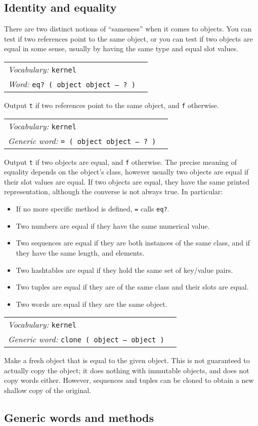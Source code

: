 \documentclass{book}
\newcommand{\vocabulary}[1]{\emph{Vocabulary:} \texttt{#1}&\\}
\newcommand{\ordinaryword}[2]{\index{\texttt{#1}}\emph{Word:} \texttt{#2}&\\}
\newcommand{\genericword}[2]{\index{\texttt{#1}}\emph{Generic word:} \texttt{#2}&\\}
\newcommand{\wordtable}[1]{


\begin{tabularx}{12cm}{lX}
\hline
#1
\hline
\end{tabularx}

}
\begin{document}
\subsection{\label{equality}Identity and equality}

There are two distinct notions of ``sameness'' when it comes to objects. You can test if two references point to the same object, or you can test if two objects are equal in some sense, usually by having the same type and equal slot values.
\wordtable{
\vocabulary{kernel}
\ordinaryword{eq?}{eq?~( object object -- ?~)}
}
Output \texttt{t} if two references point to the same object, and \texttt{f} otherwise.
\wordtable{
\vocabulary{kernel}
\genericword{=}{= ( object object -- ?~)}
}
Output \texttt{t} if two objects are equal, and \texttt{f} otherwise. The precise meaning of equality depends on the object's class, however usually two objects are equal if their slot values are equal. If two objects are equal, they have the same printed representation, although the converse is not always true. In particular:
\begin{itemize}
\item If no more specific method is defined, \texttt{=} calls \texttt{eq?}.
\item Two numbers are equal if they have the same numerical value.
\item Two sequences are equal if they are both instances of the same class, and if they have the same length, and elements.
\item Two hashtables are equal if they hold the same set of key/value pairs.
\item Two tuples are equal if they are of the same class and their slots are equal.
\item Two words are equal if they are the same object.
\end{itemize}
\wordtable{
\vocabulary{kernel}
\genericword{clone}{clone ( object -- object )}
}
Make a fresh object that is equal to the given object. This is not guaranteed to actually copy the object; it does nothing with immutable objects, and does not copy words either. However, sequences and tuples can be cloned to obtain a new shallow copy of the original.

\subsection{\label{generic}Generic words and methods}
\end{document}
